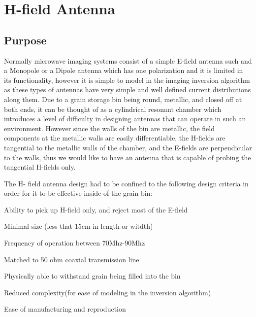 

\section{H-field Antenna}

\subsection{Purpose}

Normally microwave imaging systems consist of a simple E-field antenna such and a Monopole or a Dipole antenna which has one polarization and it is limited in its functionality, however it is simple to model in the imaging inversion algorithm as these types of antennas have very simple and well defined current distributions along them. Due to a grain storage bin being round, metallic, and closed off at both ends, it can be thought of as a cylindrical resonant chamber which introduces a level of difficulty in designing antennas that can operate in such an environment. However since the walls of the bin are metallic, the field components at the metallic walls are easily differentiable, the H-fields are tangential to the metallic walls of the chamber, and the E-fields are perpendicular to the walls, thus we would like to have an antenna that is capable of probing the tangential H-fields only.

The H- field antenna design had to be confined to the following design criteria in order for it to be effective inside of the grain bin:

\begin{itemize*}

\item Ability to pick up H-field only, and reject most of the E-field
\item Minimal size (less that 15cm in length or witdth)
\item Frequency of operation between 70Mhz-90Mhz
\item Matched to 50 ohm coaxial transmission line
\item Physically able to withstand grain being filled into the bin
\item Reduced complexity(for ease of modeling in the inversion algorithm)
\item Ease of manufacturing and reproduction

\end{itemize*}

